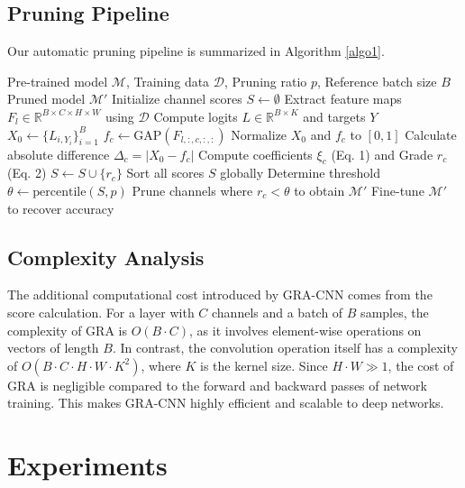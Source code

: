 \documentclass[sn-mathphys,Numbered]{sn-jnl}
\theoremstyle{thmstyleone}%
\theoremstyle{thmstyletwo}%
\theoremstyle{thmstylethree}%
\begin{document}
\subsection{Pruning Pipeline}
Our automatic pruning pipeline is summarized in Algorithm \ref{algo1}.

\begin{algorithm}
\caption{GRA-CNN Pruning Pipeline}\label{algo1}
\begin{algorithmic}[1]
\Require Pre-trained model $\mathcal{M}$, Training data $\mathcal{D}$, Pruning ratio $p$, Reference batch size $B$
\Ensure Pruned model $\mathcal{M}'$
\State Initialize channel scores $S \leftarrow \emptyset$
    \State Extract feature maps $F_l \in \mathbb{R}^{B \times C \times H \times W}$ using $\mathcal{D}$
    \State Compute logits $L \in \mathbb{R}^{B \times K}$ and targets $Y$
    \State $X_0 \leftarrow \{L_{i, Y_i}\}_{i=1}^B$ 
        \State $f_c \leftarrow \text{GAP}(F_{l,:,c,:,:})$ 
        \State Normalize $X_0$ and $f_c$ to $[0, 1]$
        \State Calculate absolute difference $\Delta_c = |X_0 - f_c|$
        \State Compute coefficients $\xi_c$ (Eq. 1) and Grade $r_c$ (Eq. 2)
        \State $S \leftarrow S \cup \{r_c\}$
    \EndFor
\EndFor
\State Sort all scores $S$ globally
\State Determine threshold $\theta \leftarrow \text{percentile}(S, p)$
\State Prune channels where $r_c < \theta$ to obtain $\mathcal{M}'$
\State Fine-tune $\mathcal{M}'$ to recover accuracy
\end{algorithmic}
\end{algorithm}

\subsection{Complexity Analysis}
The additional computational cost introduced by GRA-CNN comes from the score calculation. For a layer with $C$ channels and a batch of $B$ samples, the complexity of GRA is $O(B \cdot C)$, as it involves element-wise operations on vectors of length $B$. In contrast, the convolution operation itself has a complexity of $O(B \cdot C \cdot H \cdot W \cdot K^2)$, where $K$ is the kernel size. Since $H \cdot W \gg 1$, the cost of GRA is negligible compared to the forward and backward passes of network training. This makes GRA-CNN highly efficient and scalable to deep networks.

\section{Experiments}\label{sec4}
\end{document}
